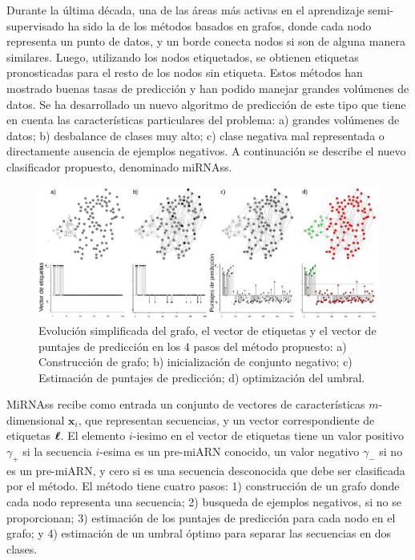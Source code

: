 Durante la última década, una de las áreas más activas en el aprendizaje semi-supervisado ha sido la de los métodos basados en grafos, donde cada nodo
representa un punto de datos, y un borde conecta nodos si son de alguna manera similares. Luego, utilizando los nodos etiquetados, se obtienen etiquetas
pronosticadas para el resto de los nodos sin etiqueta. Estos métodos han mostrado buenas tasas de predicción \citep{joachims2003transductive} y han podido
manejar grandes volúmenes de datos. Se ha desarrollado un nuevo algoritmo de predicción de este tipo que tiene en cuenta las características particulares del
problema: a) grandes volúmenes de datos; b) desbalance de clases muy alto; c) clase negativa mal representada o directamente ausencia de ejemplos negativos. A
continuación se describe el nuevo clasificador propuesto, denominado miRNAss.

\begin{figure}[tpb]
	\centering
	\includegraphics[width=\linewidth]{fig/workflow.eps}
	\caption[Evolución del grafo]{Evolución simplificada del grafo, el vector de etiquetas y el vector de puntajes de predicción en los 4 pasos del método
	propuesto: a) Construcción de grafo; b) inicialización de conjunto negativo; c) Estimación de puntajes de predicción; d) optimización del umbral.}
	\label{fig:workflow}
\end{figure}

MiRNAss recibe como entrada un conjunto de vectores de características $m$-dimensional $\mathbf{x}_{i}$, que representan secuencias, y un vector
correspondiente de etiquetas $\boldsymbol\ell$. El elemento $i$-iesimo en el vector de etiquetas tiene un valor positivo $\gamma_{+}$ si la secuencia $i$-esima es un pre-miARN
conocido, un valor negativo $\gamma_{-}$ si no es un pre-miARN, y cero si es una secuencia desconocida que debe ser clasificada por el método. El método
tiene cuatro pasos: 1) construcción de un grafo donde cada nodo representa una secuencia; 2) busqueda de ejemplos negativos, si no se proporcionan; 3) estimación
de los puntajes de predicción para cada nodo en el grafo; y 4) estimación de un umbral óptimo para separar las secuencias en dos clases.


